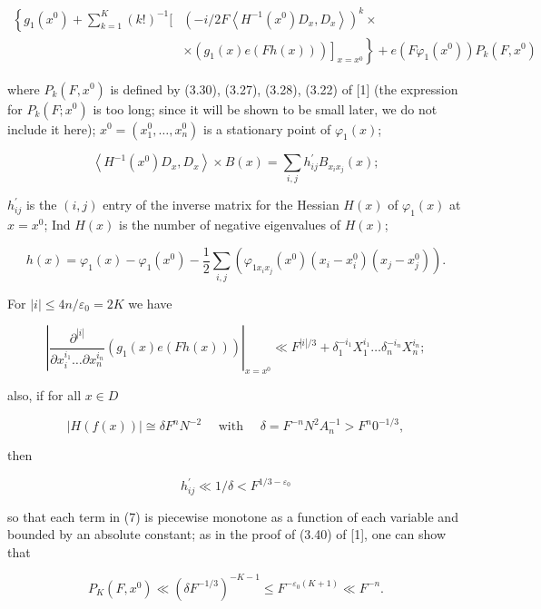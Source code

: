 \documentclass[10pt]{article}
\begin{document}
\begin{align*}
\left\{g_{1}\left(x^{0}\right)+\sum_{k=1}^{K}(k!)^{-1}[ \right. & \left(-i / 2 F\left\langle H^{-1}\left(x^{0}\right) D_{x}, D_{x}\right\rangle\right)^{k} \times  \tag{7}\\
& \left.\left.\times\left(g_{1}(x) e(F h(x))\right)\right]_{x=x^{0}}\right\}+e\left(F \varphi_{1}\left(x^{0}\right)\right) P_{k}\left(F, x^{0}\right)
\end{align*}


where $P_{k}\left(F, x^{0}\right)$ is defined by (3.30), (3.27), (3.28), (3.22) of [1] (the expression\\
for $P_{k}\left(F ; x^{0}\right)$ is too long; since it will be shown to be small later, we do not include it here); $x^{0}=\left(x_{1}^{0}, \ldots, x_{n}^{0}\right)$ is a stationary point of $\varphi_{1}(x)$;

$$
\left\langle H^{-1}\left(x^{0}\right) D_{x}, D_{x}\right\rangle \times B(x)=\sum_{i, j} h_{i j}^{\prime} B_{x_{i} x_{j}}(x) ;
$$

$h_{i j}^{\prime}$ is the $(i, j)$ entry of the inverse matrix for the Hessian $H(x)$ of $\varphi_{1}(x)$ at $x=x^{0}$; Ind $H(x)$ is the number of negative eigenvalues of $H(x)$;

$$
h(x)=\varphi_{1}(x)-\varphi_{1}\left(x^{0}\right)-\frac{1}{2} \sum_{i, j}\left(\varphi_{1 x_{i} x_{j}}\left(x^{0}\right)\left(x_{i}-x_{i}^{0}\right)\left(x_{j}-x_{j}^{0}\right)\right) .
$$

For $|i| \leqslant 4 n / \varepsilon_{0}=2 K$ we have

$$
\left|\frac{\partial^{|i|}}{\partial x_{i}^{i_{1}} \ldots \partial x_{n}^{i_{n}}}\left(g_{1}(x) e(F h(x))\right)\right|_{x=x^{0}} \ll F^{|i| / 3}+\delta_{1}^{-i_{1}} X_{1}^{i_{1}} \ldots \delta_{n}^{-i_{n}} X_{n}^{i_{n}} ;
$$

also, if for all $x \in D$

$$
|H(f(x))| \cong \delta F^{n} N^{-2} \quad \text { with } \quad \delta=F^{-n} N^{2} A_{n}^{-1}>F^{n} 0^{-1 / 3},
$$

then

$$
h_{i j}^{\prime} \ll 1 / \delta<F^{1 / 3-\varepsilon_{0}}
$$

so that each term in (7) is piecewise monotone as a function of each variable and bounded by an absolute constant; as in the proof of (3.40) of [1], one can show that

$$
P_{K}\left(F, x^{0}\right) \ll\left(\delta F^{-1 / 3}\right)^{-K-1} \leqslant F^{-\varepsilon_{0}(K+1)} \ll F^{-n} .
$$
\end{document}
